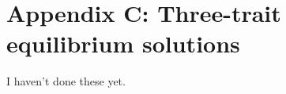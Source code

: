 \section*{Appendix C: Three-trait equilibrium solutions}

\renewcommand{\thefigure}{C\arabic{figure}}
\renewcommand{\theequation}{C\arabic{equation}}
\renewcommand{\thetable}{C\arabic{table}}
\setcounter{equation}{0}
\setcounter{figure}{0}
\setcounter{table}{0}


I haven't done these yet.
